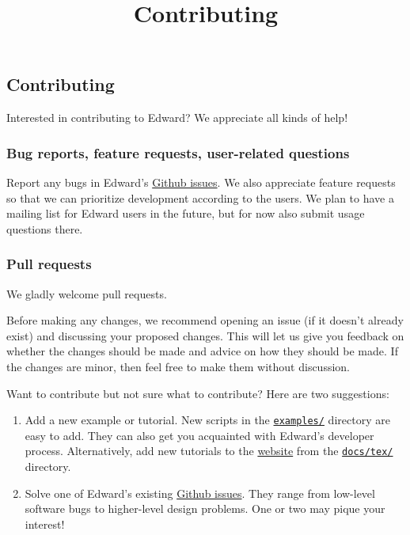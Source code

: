 \title{Contributing}

\subsection{Contributing}

Interested in contributing to Edward? We appreciate all kinds of help!

\subsubsection{Bug reports, feature requests, user-related questions}

Report any bugs in Edward's
\href{https://github.com/blei-lab/edward/issues}
{Github issues}.
We also appreciate feature requests so that we can prioritize
development according to the users.
We plan to have a
mailing list for Edward users in the future,
but for now also submit usage questions there.

\subsubsection{Pull requests}

We gladly welcome pull requests.

Before making any changes, we recommend opening an issue (if it
doesn't already exist) and discussing your proposed changes. This will
let us give you feedback on whether the changes should be made and
advice on how they should be made.
If the changes are minor, then feel free to make them
without discussion.

Want to contribute but not sure what to contribute? Here are two
suggestions:
\begin{enumerate}
\item
Add a new example or tutorial.
New scripts in the
\href{https://github.com/blei-lab/edward/tree/master/examples}
{\texttt{examples/}} directory are easy to add. They can also
get you acquainted with Edward's developer process.
Alternatively, add new tutorials to the
\href{tutorials}{website} from the
\href{https://github.com/blei-lab/edward/tree/master/docs}
{\texttt{docs/tex/}} directory.
\item
Solve one of Edward's existing
\href{https://github.com/blei-lab/edward/issues}{Github issues}.
They range from low-level software bugs to higher-level design problems.
One or two may pique your interest!
\end{enumerate}

